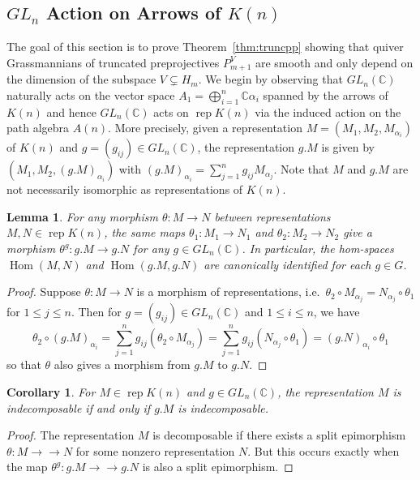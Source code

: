 \documentclass{amsart}
\newtheorem{corollary}[theorem]{Corollary}
\newtheorem{lemma}[theorem]{Lemma}
\numberwithin{equation}{section}
\newcommand{\rep}{\operatorname{rep}}
\newcommand{\CC}{\mathbb{C}}
\newcommand{\Hom}{\operatorname{Hom}}
\newcommand{\onto}{\to\!\!\!\!\!\to}
\begin{document}
\subsection{$GL_n$ Action on Arrows of $K(n)$}
The goal of this section is to prove Theorem~\ref{thm:truncpp} showing that quiver Grassmannians of truncated preprojectives $P_{m+1}^V$ are smooth and only depend on the dimension of the subspace $V\subsetneq H_m$.
We begin by observing that $GL_n(\CC)$ naturally acts on the vector space $A_1=\bigoplus_{i=1}^n \CC\alpha_i$ spanned by the arrows of $K(n)$ and hence $GL_n(\CC)$ acts on $\rep K(n)$ via the induced action on the path algebra $A(n)$.
More precisely, given a representation $M=(M_1,M_2,M_{\alpha_i})$ of $K(n)$ and $g=(g_{ij})\in GL_n(\CC)$, the representation $g.M$ is given by $(M_1,M_2,(g.M)_{\alpha_i})$ with $(g.M)_{\alpha_i}=\sum\limits_{j=1}^n g_{ij}M_{\alpha_j}$.
Note that $M$ and $g.M$ are not necessarily isomorphic as representations of $K(n)$.
\begin{lemma}
  \label{le:hom equivariance}
  For any morphism $\theta:M\to N$ between representations $M,N\in\rep K(n)$, the same maps $\theta_1:M_1\to N_1$ and $\theta_2:M_2\to N_2$ give a morphism $\theta^g:g.M\to g.N$ for any $g\in GL_n(\CC)$.
  In particular, the hom-spaces $\Hom(M,N)$ and $\Hom(g.M,g.N)$ are canonically identified for each $g\in G$.
\end{lemma}
\begin{proof}
  Suppose $\theta:M\to N$ is a morphism of representations, i.e.\ $\theta_2\circ M_{\alpha_j}=N_{\alpha_j}\circ\theta_1$ for $1\le j\le n$.
  Then for $g=(g_{ij})\in GL_n(\CC)$ and $1\le i\le n$, we have
  \[\theta_2\circ (g.M)_{\alpha_i}=\sum\limits_{j=1}^n g_{ij}(\theta_2\circ M_{\alpha_j})=\sum\limits_{j=1}^n g_{ij}(N_{\alpha_j}\circ\theta_1)=(g.N)_{\alpha_i}\circ\theta_1\]
  so that $\theta$ also gives a morphism from $g.M$ to $g.N$. 
\end{proof}
\begin{corollary}
  \label{cor:indecomposability}
  For $M\in\rep K(n)$ and $g\in GL_n(\CC)$, the representation $M$ is indecomposable if and only if $g.M$ is indecomposable.
\end{corollary}
\begin{proof}
  The representation $M$ is decomposable if there exists a split epimorphism $\theta:M\onto N$ for some nonzero representation $N$.
  But this occurs exactly when the map $\theta^g:g.M\onto g.N$ is also a split epimorphism.
\end{proof}
\end{document}
